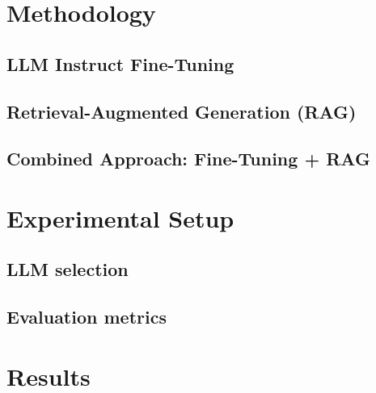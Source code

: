 \documentclass{article}
\begin{document}
\section{Methodology}
\subsection{LLM Instruct Fine-Tuning}

\subsection{Retrieval-Augmented Generation (RAG)}

\subsection{Combined Approach: Fine-Tuning + RAG}


\section{Experimental Setup}

\subsection{LLM selection}

\subsection{Evaluation metrics}


\section{Results}
\end{document}

